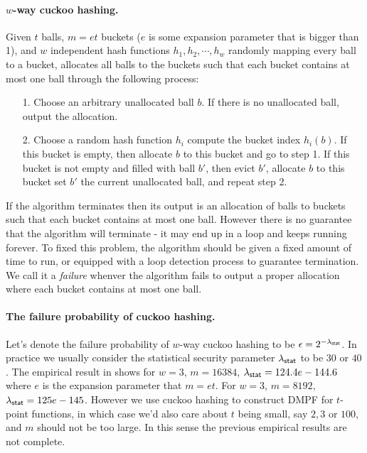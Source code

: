 \paragraph{$w$-way cuckoo hashing.}Given $t$ balls, $m=et$ buckets ($e$ is some expansion parameter that is bigger than 1), and $w$ independent hash functions $h_1, h_2,\cdots, h_w$ randomly mapping every ball to a bucket, allocates all balls to the buckets such that each bucket contains at most one ball through the following process: 
\begin{itemize}
  \item[1.] Choose an arbitrary unallocated ball $b$. If there is no unallocated ball, output the allocation. 
  \item[2.] Choose a random hash function $h_i$ compute the bucket index $h_i(b)$. If this bucket is empty, then allocate $b$ to this bucket and go to step 1. If this bucket is not empty and filled with ball $b'$, then evict $b'$, allocate $b$ to this bucket set $b'$ the current unallocated ball, and repeat step 2. 
\end{itemize}
If the algorithm terminates then its output is an allocation of balls to buckets such that each bucket contains at most one ball. However there is no guarantee that the algorithm will terminate - it may end up in a loop and keeps running forever. To fixed this problem, the algorithm should be given a fixed amount of time to run, or equipped with a loop detection process to guarantee termination. We call it a \emph{failure} whenver the algorithm fails to output a proper allocation where each bucket contains at most one ball. 


\paragraph{The failure probability of cuckoo hashing.}Let's denote the failure probability of $w$-way cuckoo hashing to be $\epsilon=2^{-\lambda_{{\sf stat}}}$. In practice we usually consider the statistical security parameter $\lambda_{{\sf stat}}$ to be $30$ or $40$. The empirical result in \cite{chen_fast_2017} shows for $w=3$, $m=16384$, $\lambda_{\sf stat} = 124.4e-144.6$ where $e$ is the expansion parameter that $m=et$. For $w=3$, $m=8192$, $\lambda_{\sf stat}=125e-145$. However we use cuckoo hashing to construct DMPF for $t$-point functions, in which case we'd also care about $t$ being small, say $2,3$ or $100$, and $m$ should not be too large. In this sense the previous empirical results are not complete. 

